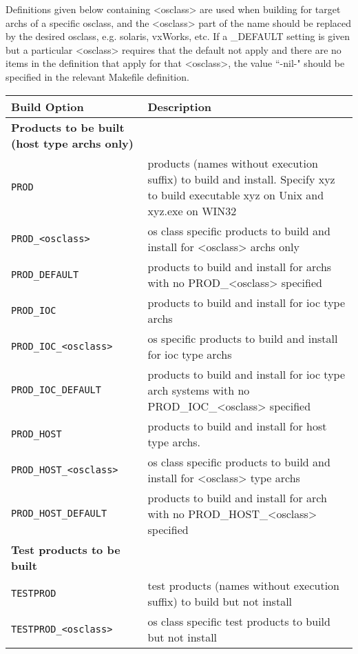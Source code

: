 Definitions given below containing \textless{}osclass\textgreater{} are used when building for target archs of a specific osclass, and the 
\textless{}osclass\textgreater{} part of the name should be replaced by the desired osclass, e.g. solaris, vxWorks, etc. If a \_DEFAULT setting is 
given but a particular \textless{}osclass\textgreater{} requires that the default not apply and there are no items in the definition that apply for 
that \textless{}osclass\textgreater{}, the value ``-nil-" should be specified in the relevant Makefile definition.
\begin{center}\begin{longtable}{p{2.94784in}p{3.76247in}}
\textbf{Build Option} & \textbf{Description}\\
\hline
\textbf{Products to be built (host type archs only)} & \\
\verb|PROD| & products (names without execution suffix) to build and install. Specify xyz to build executable xyz on Unix and xyz.exe on WIN32\\
\verb|PROD_<osclass>| & os class specific products to build and install for \textless{}osclass\textgreater{} archs only\\
\verb|PROD_DEFAULT| & products to build and install for archs with no PROD\_\textless{}osclass\textgreater{} specified\\
\verb|PROD_IOC| & products to build and install for ioc type archs\\
\verb|PROD_IOC_<osclass>| & os specific products to build and install for ioc type archs\\
\verb|PROD_IOC_DEFAULT| & products to build and install for ioc type arch systems with no PROD\_IOC\_\textless{}osclass\textgreater{} specified\\
\verb|PROD_HOST| & products to build and install for host type archs. \\
\verb|PROD_HOST_<osclass>| & os class specific products to build and install for \textless{}osclass\textgreater{} type archs\\
\verb|PROD_HOST_DEFAULT| & products to build and install for arch with no PROD\_HOST\_\textless{}osclass\textgreater{} specified\\
\textbf{Test products to be built} & \\
\verb|TESTPROD| & test products (names without execution suffix) to build but not install \\
\verb|TESTPROD_<osclass>| & os class specific test products to build but not install\\

\end{longtable}
\end{center}
